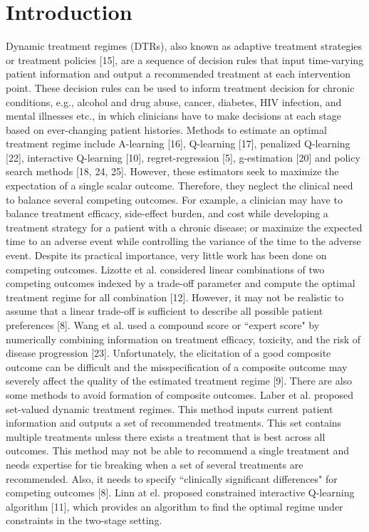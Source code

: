 \documentclass[12pt]{article}
\begin{document}
\section{Introduction}
Dynamic treatment regimes (DTRs), also known as adaptive treatment strategies or treatment policies [15], are a sequence of decision rules that input time-varying patient information and output a recommended treatment at each intervention point. These decision rules can be used to inform treatment decision for chronic conditions, e.g., alcohol and drug abuse, cancer, diabetes, HIV infection, and mental illnesses etc., in which clinicians have to make decisions at each stage based on ever-changing patient histories.
Methods to estimate an optimal treatment regime include A-learning [16], Q-learning [17], penalized Q-learning [22], interactive Q-learning [10], regret-regression [5], g-estimation [20] and policy search methods [18, 24, 25]. However, these estimators seek to maximize the expectation of a single scalar outcome. Therefore, they neglect the clinical need to balance several competing outcomes. For example, a clinician may have to balance treatment efficacy, side-effect burden, and cost while developing a treatment strategy for a patient with a chronic disease; or maximize the expected time to an adverse event while controlling the variance of the time to the adverse event. Despite its practical importance, very little work has been done on competing outcomes. Lizotte  et al. considered linear combinations of two competing outcomes indexed by a trade-off parameter and compute the optimal treatment regime for all combination [12]. However, it may not be realistic to assume that a linear trade-off is sufficient to describe all possible patient preferences [8]. Wang et al. used a compound score or ``expert score" by numerically combining information on treatment efficacy, toxicity, and the risk of disease progression [23]. Unfortunately, the elicitation of a good composite outcome can be difficult and the misspecification of a composite outcome may severely affect the quality of the estimated treatment regime [9]. There are also some methods to avoid formation of composite outcomes. Laber et al. proposed set-valued dynamic treatment regimes. This method inputs current patient information and outputs a set of recommended treatments. This set contains multiple treatments unless there exists a treatment that is best across all outcomes. This method may not be able to recommend a single treatment and needs expertise for tie breaking when a set of several treatments are recommended. Also, it needs to specify ``clinically significant differences" for competing outcomes [8]. Linn at el. proposed constrained interactive Q-learning algorithm [11], which provides an algorithm to find the optimal regime under constraints in the two-stage setting.\\
\end{document}
